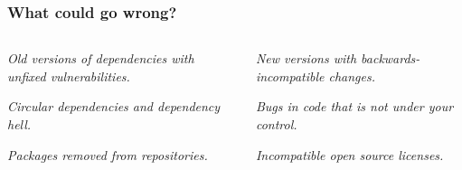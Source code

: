 \documentclass[aspectratio=169]{beamer}              %
\begin{document}
\begin{frame}
	\frametitle{What could go wrong?}
\begin{columns}
\begin{column}{0.5\textwidth}
   	\begin{block}{\color{orange}{Security vulnerabilities (CVE)}}
   		\vspace{1mm}
   		\small\emph{Old versions of dependencies with unfixed vulnerabilities.}
	\end{block}
	\begin{block}{\color{orange}{Version conflicts}}
   		\vspace{1mm}
   		\small\emph{Circular dependencies and dependency hell.}
     \end{block}
         \begin{block}{\color{orange}{Missing/removed dependency}}
   		\vspace{1mm}
   		\small\emph{Packages removed from repositories.}
     \end{block}
     
\end{column}
\begin{column}{0.5\textwidth}
\begin{block}{\color{orange}{API/ABI changes}}
   		\vspace{1mm}
   		\small\emph{New versions with backwards-incompatible changes.}
     \end{block}
      \begin{block}{\color{orange}{Broken third-party dependencies}}
   		\vspace{1mm}
   		\small\emph{Bugs in code that is not under your control.}
     \end{block}
      \begin{block}{\color{orange}{License conflicts}}
   		\vspace{1mm}
   		\small\emph{Incompatible open source licenses.}
     \end{block}
\end{column}
\end{columns}
\end{frame}
\end{document}
